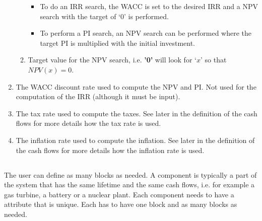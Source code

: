 \begin{enumerate}
\begin{enumerate}
  \begin{itemize}
  \item To do an IRR search, the WACC is set to the desired IRR and a NPV search with the target of ‘0’ is performed.
  \item To perform a PI search, an NPV search can be performed where the target PI is multiplied with the initial investment.
  \end{itemize}


  \item[\xmlAttr{Target}] Target value for the NPV search, i.e. \textbf{'0'} will look for ‘$x$’ so that $NPV(x) = 0$.

  \end{enumerate}

\item[\xmlNode{WACC}] The WACC discount rate used to compute the NPV and PI. Not used for the computation of the IRR (although it must be input).
\item[\xmlNode{tax}] The tax rate used to compute the taxes. See later in the definition of the cash flows for more details how the tax rate is used.
\item[\xmlNode{inflation}] The inflation rate used to compute the inflation. See later in the definition of the cash flows for more details how the inflation rate is used.

\end{enumerate}


\subsection{}

The user can define as many  blocks as needed. A component is typically a part of the system that has the same lifetime and the same cash flows, 
i.e. for example a gas turbine, a battery or a nuclear plant. Each component needs to have a  attribute that is unique. Each  has to have
 one  block and as many  blocks as needed.

